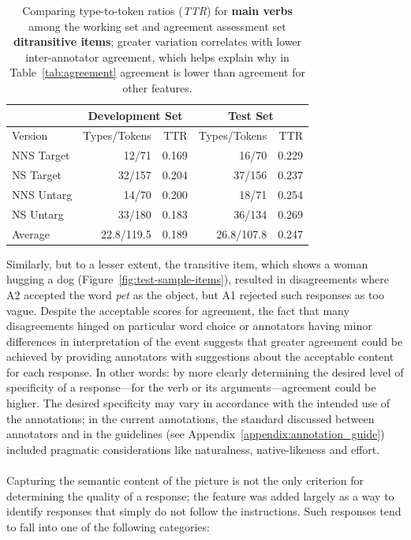 \begin{table}[htb!]
\begin{center}
\begin{tabular}{|l||r|r||r|r|}
\hline
 & \multicolumn{2}{|c||}{Development Set} & \multicolumn{2}{|c|}{Test Set} \\
\hline
Version	& Types/Tokens & TTR & Types/Tokens & TTR \\
\hline
\hline
NNS Target & 12/71 & 0.169 & 16/70 & 0.229 \\
\hline
NS Target & 32/157 & 0.204 & 37/156 & 0.237 \\
\hline
NNS Untarg & 14/70 & 0.200 & 18/71 & 0.254 \\
\hline
NS Untarg & 33/180 & 0.183 & 36/134 & 0.269 \\
\hline
\hline
Average & 22.8/119.5 & 0.189 & 26.8/107.8 & 0.247 \\
\hline
\end{tabular}
\caption{\label{tab:pref-dev-vs-test} Comparing type-to-token ratios (\textit{TTR}) for \textbf{main verbs} among the working set and agreement assessment set \textbf{ditransitive items}; greater variation correlates with lower  inter-annotator agreement, which helps explain why in Table~\ref{tab:agreement}  agreement is lower than agreement for other features.}
\end{center}
\end{table}

Similarly, but to a lesser extent, the transitive item, which shows a woman hugging a dog (Figure~\ref{fig:test-sample-items}), resulted in disagreements where A2 accepted the word \textit{pet} as the object, but A1 rejected such responses as too vague. Despite the acceptable scores for  agreement, the fact that many disagreements hinged on particular word choice or annotators having minor differences in interpretation of the event suggests that greater agreement could be achieved by providing annotators with suggestions about the acceptable content for each response. In other words: by more clearly determining the desired level of specificity of a response---for the verb or its arguments---agreement could be higher. The desired specificity may vary in accordance with the intended use of the annotations; in the current annotations, the standard discussed between annotators and in the guidelines (see Appendix~\ref{appendix:annotation_guide}) included pragmatic considerations like naturalness, native-likeness and effort.

\paragraph{} Capturing the semantic content of the picture is not the only criterion for determining the quality of a response; the  feature was added largely as a way to identify responses that simply do not follow the instructions. Such responses tend to fall into one of the following categories:

